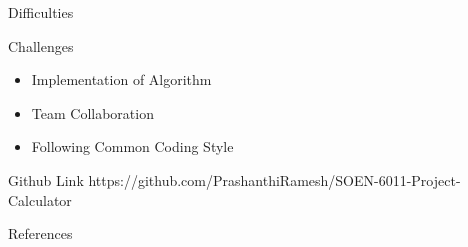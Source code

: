 \documentclass[final]{beamer}
\newlength{\onecolwid}
\begin{document}
\begin{frame}
\begin{columns}[t]
\begin{column}{\onecolwid}
\begin{exampleblock}{Difficulties}
\end{exampleblock}


\begin{exampleblock}{Challenges}

\begin{itemize}
\item Implementation of Algorithm
\item Team Collaboration
\item Following Common Coding Style\cite{googlestyle}
\end{itemize}

\end{exampleblock}

\begin{exampleblock}{Github Link}
https://github.com/PrashanthiRamesh/SOEN-6011-Project-Calculator
\end{exampleblock}

\begin{exampleblock}{References}
\nocite{*} %
\small{
\vspace{1cm}}
\end{exampleblock}









\end{column}
\end{columns}
\end{frame}
\end{document}
